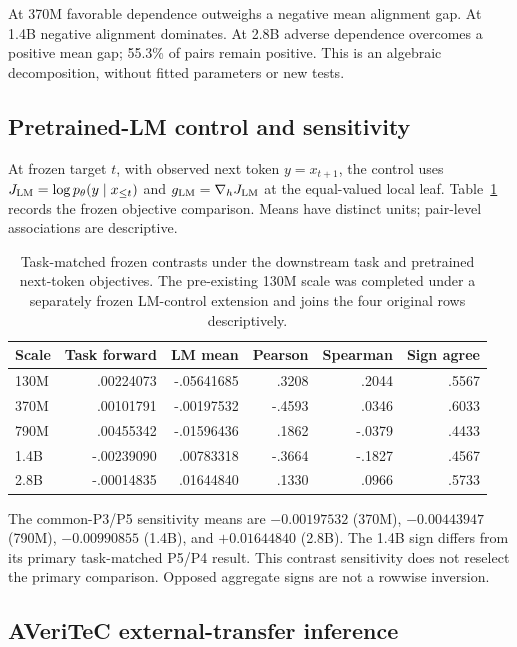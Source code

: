 At 370M favorable dependence outweighs a negative mean alignment gap.
At 1.4B negative alignment dominates. At 2.8B adverse dependence
overcomes a positive mean gap; 55.3\% of pairs remain positive.
This is an algebraic decomposition, without fitted parameters or new tests.

\subsection{Pretrained-LM control and sensitivity}
\label{app:vanilla}

At frozen target $t$, with observed next token $y=x_{t+1}$, the control
uses $J_{\rm LM}=\log p_\theta(y\mid x_{\leq t})$ and
$g_{\rm LM}=\nabla_h J_{\rm LM}$ at the equal-valued local leaf.
Table~\ref{tab:vanilla} records the frozen objective comparison. Means
have distinct units; pair-level associations are descriptive.

\begin{table}[h]
\centering\small
\caption{Task-matched frozen contrasts under the downstream task and pretrained
next-token objectives. The pre-existing 130M scale was completed under a
separately frozen LM-control extension and joins the four original rows
descriptively.}
\label{tab:vanilla}
\begin{tabular}{lrrrrr}
\toprule
Scale & Task forward & LM mean & Pearson & Spearman & Sign agree \\
\midrule
130M & .00224073 & -.05641685 & .3208 & .2044 & .5567 \\
370M & .00101791 & -.00197532 & -.4593 & .0346 & .6033 \\
790M & .00455342 & -.01596436 & .1862 & -.0379 & .4433 \\
1.4B & -.00239090 & .00783318 & -.3664 & -.1827 & .4567 \\
2.8B & -.00014835 & .01644840 & .1330 & .0966 & .5733 \\
\bottomrule
\end{tabular}
\end{table}

The common-P3/P5 sensitivity means are $-0.00197532$ (370M),
$-0.00443947$ (790M), $-0.00990855$ (1.4B), and
$+0.01644840$ (2.8B).
The 1.4B sign differs from its primary task-matched P5/P4 result.
This contrast sensitivity does not reselect the primary comparison.
Opposed aggregate signs are not a rowwise inversion.

\subsection{AVeriTeC external-transfer inference}
\label{app:external}

